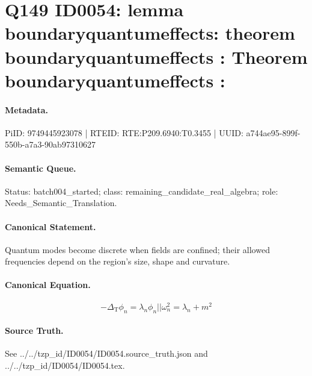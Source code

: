 \section*{Q149 ID0054: lemma boundaryquantumeffects: theorem boundaryquantumeffects : Theorem boundaryquantumeffects :}
\paragraph{Metadata.}
PiID: 9749445923078 | RTEID: RTE:P209.6940:T0.3455 | UUID: a744ae95-899f-550b-a7a3-90ab97310627

\paragraph{Semantic Queue.}
Status: batch004\_started; class: remaining\_candidate\_real\_algebra; role: Needs\_Semantic\_Translation.

\paragraph{Canonical Statement.}
Quantum modes become discrete when fields are confined; their allowed frequencies depend on the region's size, shape and curvature.

\paragraph{Canonical Equation.}
\[
-\Delta_{\mathrm{T}}\phi_{n} = \lambda_{n}\phi_{n} || \omega_{n}^{2} = \lambda_{n} + m^{2}
\]

\paragraph{Source Truth.}
See ../../tzp\_id/ID0054/ID0054.source\_truth.json and ../../tzp\_id/ID0054/ID0054.tex.
